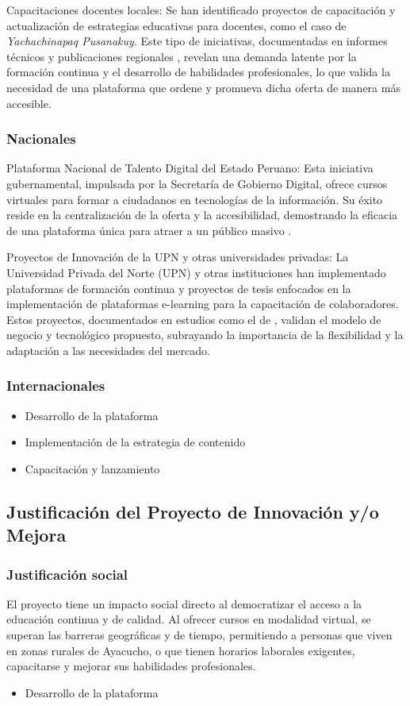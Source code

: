 Capacitaciones docentes locales: Se han identificado proyectos de capacitación y actualización de estrategias educativas para docentes, como el caso de \textit{Yachachinapaq Pusanakuy}. Este tipo de iniciativas, documentadas en informes técnicos y publicaciones regionales \citep{garcia2020}, revelan una demanda latente por la formación continua y el desarrollo de habilidades profesionales, lo que valida la necesidad de una plataforma que ordene y promueva dicha oferta de manera más accesible.


\subsubsection{Nacionales}
Plataforma Nacional de Talento Digital del Estado Peruano: Esta iniciativa gubernamental, impulsada por la Secretaría de Gobierno Digital, ofrece cursos virtuales para formar a ciudadanos en tecnologías de la información. Su éxito reside en la centralización de la oferta y la accesibilidad, demostrando la eficacia de una plataforma única para atraer a un público masivo \citep{pcm2022}.

Proyectos de Innovación de la UPN y otras universidades privadas: La Universidad Privada del Norte (UPN) y otras instituciones han implementado plataformas de formación continua y proyectos de tesis enfocados en la implementación de plataformas e-learning para la capacitación de colaboradores. Estos proyectos, documentados en estudios como el de \citep{ramos2021}, validan el modelo de negocio y tecnológico propuesto, subrayando la importancia de la flexibilidad y la adaptación a las necesidades del mercado.


\subsubsection{Internacionales}
\begin{itemize}
	\item {Desarrollo de la plataforma}
	\item {Implementación de la estrategia de contenido}
	\item {Capacitación y lanzamiento}
\end{itemize}

\subsection{Justificación del Proyecto de Innovación y/o Mejora}
\subsubsection{Justificación social}
El proyecto tiene un impacto social directo al democratizar el acceso a la educación continua y de calidad. Al ofrecer cursos en modalidad virtual, se superan las barreras geográficas y de tiempo, permitiendo a personas que viven en zonas rurales de Ayacucho, o que tienen horarios laborales exigentes, capacitarse y mejorar sus habilidades profesionales.
\begin{itemize}
	\item {Desarrollo de la plataforma}
\end{itemize}

